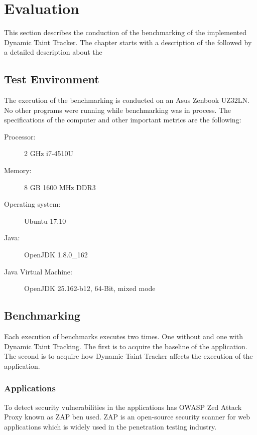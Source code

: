 \chapter{Evaluation}

This section describes the conduction of the benchmarking of the implemented Dynamic Taint Tracker. The chapter starts with a description of the \textit{} followed by a detailed description about the \textit{}



\section{Test Environment}
\label{TestEnvironment}
The execution of the benchmarking is conducted on an Asus Zenbook UZ32LN. No other programs were running while benchmarking was in process. The specifications of the computer and other important metrics are the following:

\begin{description}
    \item [Processor:] 2 GHz i7-4510U
    \item [Memory:] 8 GB 1600 MHz DDR3
    \item [Operating system:] Ubuntu 17.10
    \item [Java:] OpenJDK 1.8.0\_162
    \item [Java Virtual Machine:] OpenJDK 25.162-b12, 64-Bit, mixed mode
\end{description}



\section{Benchmarking}
\label{Benchmarking}
Each execution of benchmarks executes two times. One without and one with Dynamic Taint Tracking. The first is to acquire the baseline of the application. The second is to acquire how Dynamic Taint Tracker affects the execution of the application.



\subsection{Applications}
To detect security vulnerabilities in the applications has OWASP Zed Attack Proxy \parencite{zap} known as ZAP ben used. ZAP is an open-source security scanner for web applications which is widely used in the penetration testing industry.

